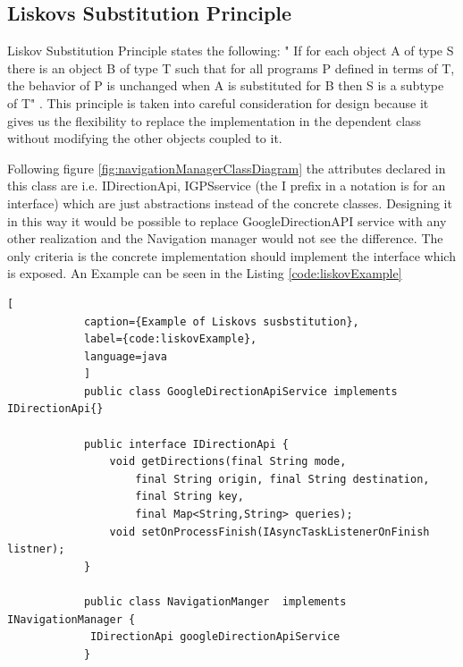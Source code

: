 \subsection{Liskovs Substitution Principle}
    Liskov Substitution Principle states the following: " If for each object A of type S
    there is an object B of type T such that for all programs P defined in terms of T,
    the behavior of P is unchanged when A is substituted for B then S is a subtype of T"  
    \cite{Hotop2015}. This principle is taken into careful consideration for design 
    because it gives us the flexibility to replace the implementation in the dependent 
    class without modifying the other objects coupled to it. 
    \par
        Following figure \ref{fig:navigationManagerClassDiagram} the attributes declared
        in this class are i.e. IDirectionApi, IGPSservice (the I prefix in a notation is for
        an interface) which are just abstractions instead of the concrete classes.
        Designing it in this way it would be possible to replace GoogleDirectionAPI service
        with any other realization and the Navigation manager would not see the difference.
        The only criteria is the concrete implementation should implement the interface
        which is exposed. An Example can be seen in the Listing \ref{code:liskovExample}

        \newpage
        \begin{lstlisting}[
            caption={Example of Liskovs susbstitution},
            label={code:liskovExample},
            language=java
            ]
            public class GoogleDirectionApiService implements IDirectionApi{}

            public interface IDirectionApi {
                void getDirections(final String mode, 
                    final String origin, final String destination, 
                    final String key, 
                    final Map<String,String> queries);
                void setOnProcessFinish(IAsyncTaskListenerOnFinish listner);
            }

            public class NavigationManger  implements INavigationManager {
             IDirectionApi googleDirectionApiService
            }
             
        \end{lstlisting} 


